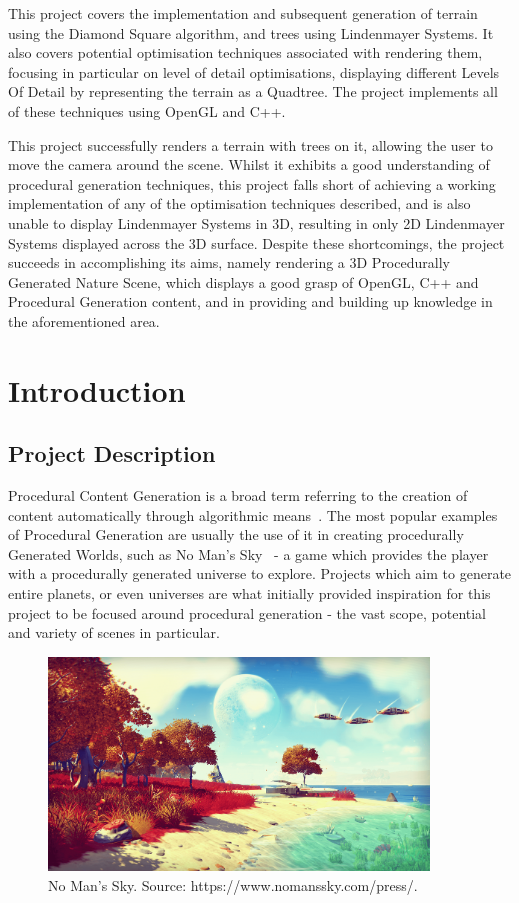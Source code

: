 \documentclass[a4paper,10pt]{report}
\begin{document}
This project covers the implementation and subsequent generation of terrain using the Diamond Square algorithm, and trees using Lindenmayer Systems. It also covers potential optimisation techniques associated with rendering them, focusing in particular on level of detail optimisations, displaying different Levels Of Detail by representing the terrain as a Quadtree. The project implements all of these techniques using OpenGL and C++. \medskip

This project successfully renders a terrain with trees on it, allowing the user to move the camera around the scene. Whilst it exhibits a good understanding of procedural generation techniques, this project falls short of achieving a working implementation of any of the optimisation techniques described, and is also unable to display Lindenmayer Systems in 3D, resulting in only 2D Lindenmayer Systems displayed across the 3D surface. Despite these shortcomings, the project succeeds in accomplishing its aims, namely rendering a 3D Procedurally Generated Nature Scene, which displays a good grasp of OpenGL, C++ and Procedural Generation content, and in providing and building up knowledge in the aforementioned area. 
\clearpage
\chapter{Introduction}
\section{Project Description}

Procedural Content Generation is a broad term referring to the creation of content automatically through algorithmic means~\cite{yannakakis2011experience}. The most popular examples of Procedural Generation are usually the use of it in creating procedurally Generated Worlds, such as No Man's Sky~\cite{nomanssky} - a game which provides the player with a procedurally generated universe to explore. Projects which aim to generate entire planets, or even universes are what initially provided inspiration for this project to be focused around procedural generation - the vast scope, potential and variety of scenes in particular. \medskip


\begin{figure}[h!]
    \centering
  \includegraphics[width=0.9\textwidth]{Images/External/NoMansSky.png}
 \caption{No Man's Sky. Source: https://www.nomanssky.com/press/.}
 \label{fig:no_mans_sky}
\end{figure}
\end{document}
